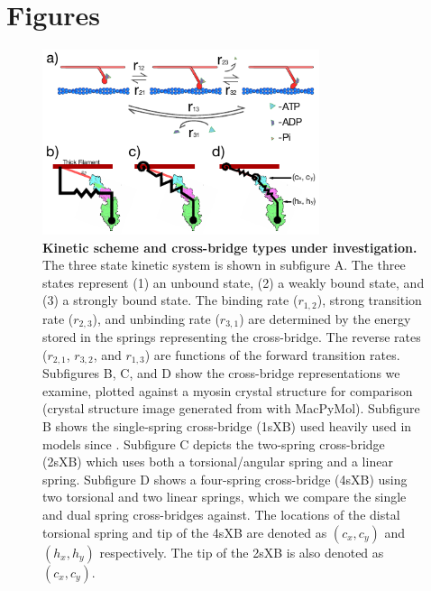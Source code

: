 \documentclass[]{article}
\begin{document}


\clearpage
\section*{Figures} %

\begin{figure}[htbp]
    \begin{center}
    \includegraphics[width=3.2in]{../imgs/Figure1.pdf}
    \caption{
        \label{fig_xb_types}
        \textbf{Kinetic scheme and cross-bridge types under investigation.} 
        The three state kinetic system is shown in subfigure A. 
        The three states represent (1) an unbound state, (2) a weakly bound state, and (3) a strongly bound state. 
        The binding rate ($r_{1,2}$), strong transition rate ($r_{2,3}$), and unbinding rate ($r_{3,1}$) are determined by the energy stored in the springs representing the cross-bridge. 
        The reverse rates ($r_{2,1}$, $r_{3,2}$, and $r_{1,3}$) are functions of the forward transition rates.
        Subfigures B, C, and D show the cross-bridge representations we examine, plotted against a myosin crystal structure for comparison (crystal structure image generated from \citet{Gourinath2003} with MacPyMol). 
        Subfigure B shows the single-spring cross-bridge (1sXB) used heavily used in models since \protect\citep{Huxley1957}. 
        Subfigure C depicts the two-spring cross-bridge (2sXB) which uses both a torsional/angular spring and a linear spring. 
        Subfigure D shows a four-spring cross-bridge (4sXB) using two torsional and two linear springs, which we compare the single and dual spring cross-bridges against. 
        The locations of the distal torsional spring and tip of the 4sXB are denoted as $(c_x, c_y)$ and $(h_x, h_y)$ respectively. 
        The tip of the 2sXB is also denoted as $(c_x, c_y)$.
    }
    \end{center}
\end{figure}
\end{document}
